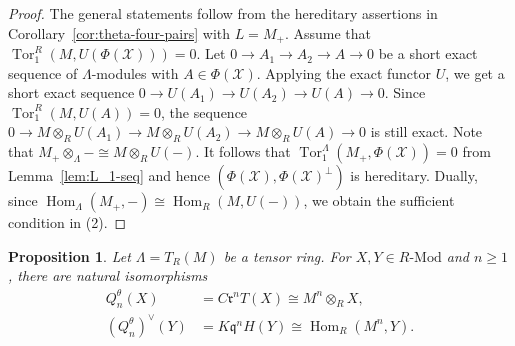 \documentclass[11pt,reqno]{amsart}
\numberwithin{equation}{section}
\newtheorem{proposition}[theorem]{Proposition}
\newcommand{\cX}{\mathcal X}
\newcommand{\Hom}{\operatorname{Hom}}
\newcommand{\Tor}{\operatorname{Tor}}
\newcommand{\radf}{\mathfrak r}
\newcommand{\coradf}{\mathfrak q}
\begin{document}
\begin{proof}
The general statements follow from the hereditary assertions in Corollary~\ref{cor:theta-four-pairs} with $L=M_+$. Assume that
$\Tor_1^R(M,U(\Phi(\cX)))=0$. Let $0\to A_1\to A_2\to A\to 0$ be a short exact sequence of $\Lambda$-modules with $A\in \Phi(\cX)$.
Applying the exact functor $U$, we get a short exact sequence $0\to U(A_1)\to U(A_2)\to U(A)\to 0$. Since $\Tor_1^R(M,U(A))=0$, the
sequence $0\to M\otimes_RU(A_1)\to M\otimes_RU(A_2)\to M\otimes_RU(A)\to 0$ is still exact.
Note that
$
M_+\otimes_\Lambda-
\cong M\otimes_RU(-).
$
It follows that $\Tor_1^\Lambda(M_+,\Phi(\cX))=0$ from Lemma~\ref{lem:L_1-seq} and hence $(\Phi(\cX),\Phi(\cX)^\perp)$ is hereditary. Dually, since
$
\Hom_\Lambda(M_+,-)
\cong\Hom_R(M,U(-))
$, we obtain the sufficient condition in (2).
\end{proof}


\begin{proposition}\label{prop:tensor-layers}
Let $\Lambda=T_R(M)$ be a tensor ring. For $X,Y\in R\text{-Mod}$ and $n\geq 1$, there are natural isomorphisms
\begin{equation*}%
\begin{aligned}
Q_n^\theta(X)&=C\radf^nT(X)\cong M^n\otimes_RX,\\
(Q_n^\theta)^\vee(Y)&=K\coradf^nH(Y)\cong\Hom_R(M^n,Y).
\end{aligned}
\end{equation*}
\end{proposition}
\end{document}
